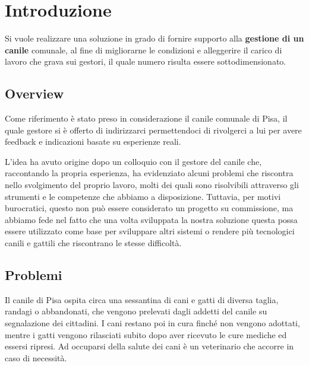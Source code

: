 \chapter{Introduzione}
Si vuole realizzare una soluzione in grado di fornire supporto alla
\textbf{gestione di un canile} comunale, al fine di migliorarne le condizioni e alleggerire il carico di lavoro che grava sui gestori, il quale numero risulta essere sottodimensionato.

\section{Overview}
Come riferimento è stato preso in considerazione il  canile comunale di Pisa, il quale gestore si è offerto di indirizzarci permettendoci di rivolgerci a lui per avere feedback e indicazioni basate su esperienze reali.

L'idea ha avuto origine dopo un colloquio con il gestore del canile che, raccontando la propria esperienza, ha evidenziato alcuni problemi che riscontra nello svolgimento del proprio lavoro, molti dei quali sono risolvibili attraverso gli strumenti e le competenze che abbiamo a disposizione. Tuttavia, per motivi burocratici, questo non può essere considerato un progetto su commissione, ma abbiamo fede nel fatto che una volta sviluppata la nostra soluzione questa possa essere utilizzato come base per sviluppare altri sistemi o rendere più tecnologici canili e gattili che riscontrano le stesse difficoltà.

\section{Problemi}
Il canile di Pisa ospita circa una sessantina di cani e gatti di diversa taglia, randagi o abbandonati, che vengono prelevati dagli addetti del canile su segnalazione dei cittadini. I cani restano poi in cura finché non vengono adottati, mentre i gatti vengono rilasciati subito dopo aver ricevuto le cure  mediche ed essersi ripresi. Ad occuparsi della salute dei cani è un veterinario che accorre in caso di necessità.

